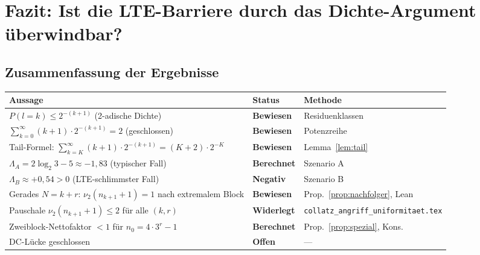 \documentclass[12pt,a4paper]{article}
\newcommand{\vii}{\nu_2}
\begin{document}
\section{Fazit: Ist die LTE-Barriere durch das Dichte-Argument überwindbar?}
\label{sec:fazit}

\subsection{Zusammenfassung der Ergebnisse}

\begin{center}
\renewcommand{\arraystretch}{1.4}
\begin{tabular}{>{\raggedright}p{5.8cm}
                >{\centering}p{2.8cm}
                >{\raggedright\arraybackslash}p{4.6cm}}
\toprule
\textbf{Aussage} & \textbf{Status} & \textbf{Methode} \\
\midrule
$P(l=k) \leq 2^{-(k+1)}$ (2-adische Dichte)
  & \textcolor{bewiesengrün}{\bfseries Bewiesen}
  & Residuenklassen \\[2pt]
$\sum_{k=0}^{\infty}(k+1)\cdot 2^{-(k+1)} = 2$ (geschlossen)
  & \textcolor{bewiesengrün}{\bfseries Bewiesen}
  & Potenzreihe \\[2pt]
Tail-Formel: $\sum_{k=K}^{\infty}(k+1)\cdot 2^{-(k+1)} = (K+2)\cdot 2^{-K}$
  & \textcolor{bewiesengrün}{\bfseries Bewiesen}
  & Lemma~\ref{lem:tail} \\[2pt]
$\Lambda_A = 2\log_2 3 - 5 \approx -1{,}83$ (typischer Fall)
  & \textcolor{bewiesengrün}{\bfseries Berechnet}
  & Szenario A \\[2pt]
$\Lambda_B \approx +0{,}54 > 0$ (LTE-schlimmster Fall)
  & \textcolor{lückenrot}{\bfseries Negativ}
  & Szenario B \\[2pt]
Gerades $N=k+r$: $\vii(n_{k+1}+1)=1$ nach extremalem Block
  & \textcolor{bewiesengrün}{\bfseries Bewiesen}
  & Prop.~\ref{prop:nachfolger}, Lean \\[2pt]
Pauschale $\vii(n_{k+1}+1)\leq 2$ für alle $(k,r)$
  & \textcolor{lückenrot}{\bfseries Widerlegt}
  & \texttt{collatz\_angriff\_uniformitaet.tex} \\[2pt]
Zweiblock-Nettofaktor $< 1$ für $n_0 = 4\cdot 3^r - 1$
  & \textcolor{bewiesengrün}{\bfseries Berechnet}
  & Prop.~\ref{prop:spezial}, Kons. \\[2pt]
DC-Lücke geschlossen
  & \textcolor{lückenrot}{\bfseries Offen}
  & --- \\
\bottomrule
\end{tabular}
\end{center}
\end{document}
